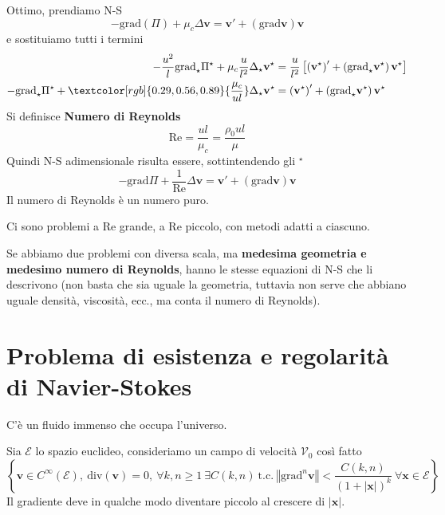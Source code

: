 \documentclass[10pt,a4paper,twoside]{book}
\begin{document}
Ottimo, prendiamo N-S
\begin{equation*}
-\mathrm{grad}( \Pi ) +\mu _{c} \Delta \mathbf{v} =\mathbf{v} '+(\mathrm{grad}\mathbf{v})\mathbf{v}
\end{equation*}
e sostituiamo tutti i termini
\begin{equation*}
\begin{aligned}
-\frac{u^{2}}{l}\mathrm{grad}_{\star } \Pi ^{\star } +\mu _{c}\frac{u}{l^{2}} \Delta _{\star }\mathbf{v}^{\star } & =\frac{u}{l^{2}}\left[\left(\mathbf{v}^{\star }\right) '+\left(\mathrm{grad}_{\star }\mathbf{v}^{\star }\right)\mathbf{v}^{\star }\right]\\
-\mathrm{grad}_{\star } \Pi ^{\star } +\textcolor[rgb]{0.29,0.56,0.89}{\frac{\mu _{c}}{ul}} \Delta _{\star }\mathbf{v}^{\star } & =\left(\mathbf{v}^{\star }\right) '+\left(\mathrm{grad}_{\star }\mathbf{v}^{\star }\right)\mathbf{v}^{\star }
\end{aligned}
\end{equation*}
Si definisce \textbf{Numero di Reynolds}
\begin{equation*}
\boxed{\mathrm{Re} =\frac{ul}{\mu _{c}} =\frac{\rho _{0} ul}{\mu }}
\end{equation*}
Quindi N-S adimensionale risulta essere, sottintendendo gli $^{\star }$
\begin{equation*}
-\mathrm{grad} \Pi +\frac{1}{\mathrm{Re}} \Delta \mathbf{v} =\mathbf{v} '+(\mathrm{grad}\mathbf{v})\mathbf{v}
\end{equation*}
Il numero di Reynolds è un numero puro.

Ci sono problemi a $\mathrm{Re}$ grande, a $\mathrm{Re}$ piccolo, con metodi adatti a ciascuno.
\begin{oss}
Se abbiamo due problemi con diversa scala, ma \textbf{medesima geometria e medesimo numero di Reynolds}, hanno le stesse equazioni di N-S che li descrivono (non basta che sia uguale la geometria, tuttavia non serve che abbiano uguale densità, viscosità, ecc., ma conta il numero di Reynolds).
\end{oss}
\section{Problema di esistenza e regolarità di Navier-Stokes}

C'è un fluido immenso che occupa l'universo.

Sia $\mathcal{E}$ lo spazio euclideo, consideriamo un campo di velocità $\mathcal{V}_{0}$ così fatto
\begin{equation*}
\left\{\mathbf{v} \in C^{\infty }(\mathcal{E}) ,\ \mathrm{div}(\mathbf{v}) =0,\ \forall k,n\geqslant 1\ \exists C( k,n) \ \text{t.c.} \ \left\Vert \mathrm{grad}^{n}\mathbf{v}\right\Vert < \frac{C( k,n)}{( 1+| \mathbf{x}| )^{k}} \ \forall \mathbf{x} \in \mathcal{E}\right\}
\end{equation*}
Il gradiente deve in qualche modo diventare piccolo al crescere di $| \mathbf{x}| $.
\end{document}
